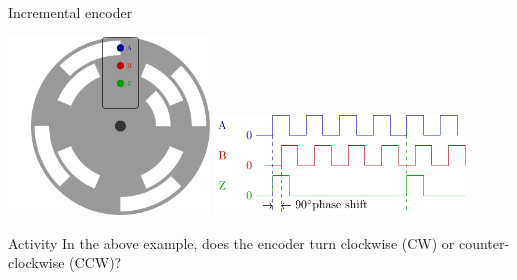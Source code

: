 \documentclass[presentation,aspectratio=169]{beamer}
\begin{document}
\begin{frame}[label={sec:org0f28803}]{Incremental encoder}
\begin{center}
\includegraphics[width=0.4\textwidth]{../../figures/encoder-disc}
\includegraphics[width=0.5\textwidth]{../../figures/encoder-signals}
\end{center}

\alert{Activity} In the above example, does the encoder turn clockwise (CW) or counter-clockwise (CCW)?
\end{frame}
\end{document}

